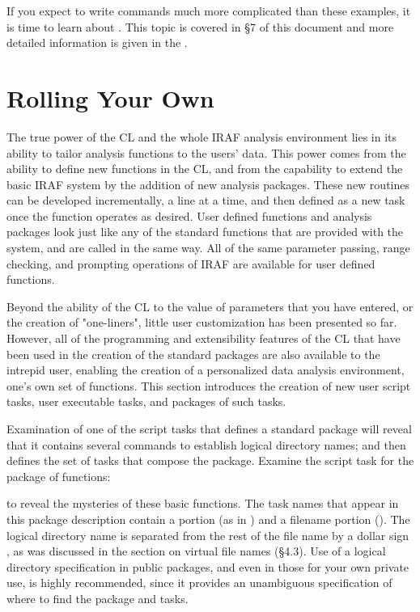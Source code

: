 If you expect to write commands much more complicated than these
examples, it is time to learn about . This topic
is covered in \S 7 of this document and more detailed information
is given in the .

\newpage
\section{Rolling Your Own}

The true power of the CL and the whole IRAF analysis 
environment lies in its ability to tailor analysis functions to the 
users' data.  This power comes from the ability to define new
functions in the CL, and from the capability to extend the
basic IRAF system by the addition of new analysis packages. 
These new routines can be developed incrementally, a line at a time,
and then defined as a new task once the function operates as desired.
User defined functions and analysis packages look just like any of the standard
functions that are provided with the system, and are called in the same way.
All of the same parameter passing, range checking, and prompting operations
of IRAF are available for user defined functions.  

Beyond the ability of the CL to  the value of parameters
that you have entered, or the creation of "one-liners",
little user customization has been presented so far. 
However, all of the programming and extensibility features of the CL
that have been used in the creation of the standard packages are also 
available to the intrepid user, enabling the creation of a personalized 
data analysis environment, one's own set of  functions.  
This section introduces the creation of new user script tasks, 
user executable tasks, and packages of such tasks.

Examination of one of the  script tasks that
defines a standard package will reveal that it
contains several  commands to establish 
logical directory names; and then defines the set of 
tasks that compose the package.  Examine the script task 
for the  package of functions:

\begin{quotation}\noindent
{} 
\end{quotation}

\noindent
to reveal the mysteries of these basic functions.  
The task names that appear 
in this package description contain a 
portion (as in ) and a filename portion 
().  The logical directory name is separated from 
the rest of the file name by a dollar sign , 
as was discussed in
the section on virtual file names (\S 4.3).  Use of a logical directory
specification in public packages, and even in those for your own private
use, is highly recommended, since it provides an unambiguous 
specification of where to find the package and tasks.

